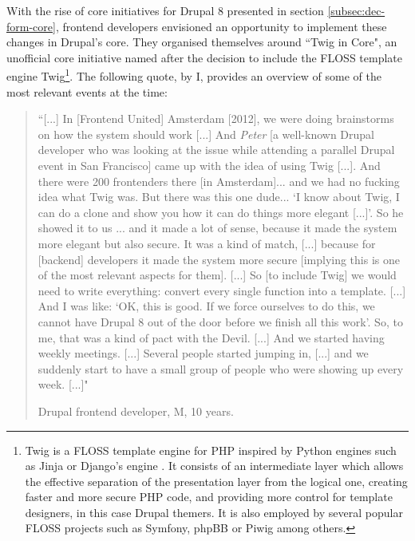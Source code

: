 With the rise of core initiatives for Drupal 8 presented in section \ref{subsec:dec-form-core}, frontend developers envisioned an opportunity to implement these changes in Drupal's core. They organised themselves around ``Twig in Core", an unofficial core initiative named after the decision to include the FLOSS template engine Twig\footnote{Twig \parencite{twig-doc:Online} is a FLOSS template engine for PHP inspired by Python engines such as Jinja \parencite{jinja:Online} or Django's engine \parencite{django:Online}. It consists of an intermediate layer which allows the effective separation of the presentation layer from the logical one, creating faster and more secure PHP code, and providing more control for template designers, in this case Drupal themers. It is also employed by several popular FLOSS projects such as Symfony, phpBB or Piwig among others.}. The following quote, by I, provides an overview of some of the most relevant events at the time:

\begin{quotation}
``[...] In [Frontend United] Amsterdam [2012], we were doing brainstorms on how the system should work [...] And \textit{Peter} [a well-known Drupal developer who was looking at the issue while attending a parallel Drupal event in San Francisco] came up with the idea of using Twig [...]. And there were 200 frontenders there [in Amsterdam]... and we had no fucking idea what Twig was. But there was this one dude... `I know about Twig, I can do a clone and show you how it can do things more elegant [...]'. So he showed it to us ... and it made a lot of sense, because it made the system more elegant but also secure. It was a kind of match, [...] because for [backend] developers it made the system more secure [implying this is one of the most relevant aspects for them]. [...] So [to include Twig] we would need to write everything: convert every single function into a template. [...] And I was like: `OK, this is good. If we force ourselves to do this, we cannot have Drupal 8 out of the door before we finish all this work'. So, to me, that was a kind of pact with the Devil. [...] And we started having weekly meetings. [...] Several people started jumping in, [...] and we suddenly start to have a small group of people who were showing up every week. [...]"
\begin{flushright}\footnotesize{Drupal frontend developer, M, 10 years.}\end{flushright}
\end{quotation}

